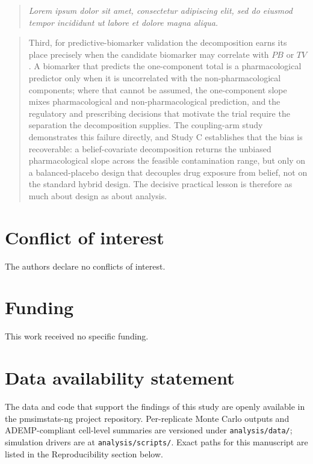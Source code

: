 \documentclass[
  11pt,
]{article}
\newenvironment{rgt}{%
  \begin{quote}\small\itshape\color[RGB]{20,60,160}}{%
  \end{quote}}
\newenvironment{orig}{%
  \begin{quote}\normalsize\color[gray]{0.55}}{%
  \end{quote}}
\begin{document}
\begin{rgt}
Lorem ipsum dolor sit amet, consectetur adipiscing elit, sed do eiusmod tempor incididunt ut labore et dolore magna aliqua.

\end{rgt}

\begin{orig}
Third, for predictive-biomarker validation the decomposition earns
its place precisely when the candidate biomarker may correlate with
\(PB\) or \(TV\). A biomarker that predicts the one-component total is a
pharmacological predictor only when it is uncorrelated with the
non-pharmacological components; where that cannot be assumed, the
one-component slope mixes pharmacological and non-pharmacological
prediction, and the regulatory and prescribing decisions that
motivate the trial require the separation the decomposition
supplies. The coupling-arm study demonstrates this failure directly,
and Study C establishes that the bias is recoverable: a belief-covariate
decomposition returns the unbiased pharmacological slope across the
feasible contamination range, but only on a balanced-placebo design that
decouples drug exposure from belief, not on the standard hybrid design.
The decisive practical lesson is therefore as much about design as about
analysis.

\end{orig}

\section{Conflict of interest}\label{conflict-of-interest}

The authors declare no conflicts of interest.

\section{Funding}\label{funding}

This work received no specific funding.

\section{Data availability statement}\label{data-availability-statement}

The data and code that support the findings of this study are
openly available in the pmsimstats-ng project repository.
Per-replicate Monte Carlo outputs and ADEMP-compliant cell-level
summaries are versioned under \texttt{analysis/data/};
simulation drivers are at \texttt{analysis/scripts/}. Exact
paths for this manuscript are listed in the Reproducibility
section below.
\end{document}
